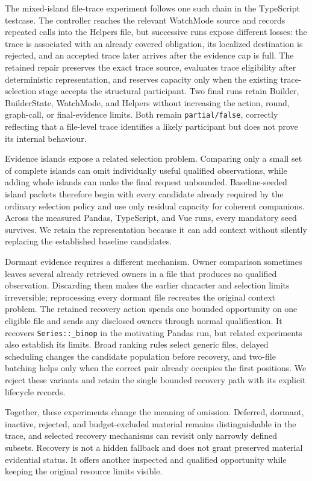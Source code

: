 The mixed-island file-trace experiment follows one such chain in the TypeScript testcase. The controller reaches the relevant WatchMode source and records repeated calls into the Helpers file, but successive runs expose different losses: the trace is associated with an already covered obligation, its localized destination is rejected, and an accepted trace later arrives after the evidence cap is full. The retained repair preserves the exact trace source, evaluates trace eligibility after deterministic representation, and reserves capacity only when the existing trace-selection stage accepts the structural participant. Two final runs retain Builder, BuilderState, WatchMode, and Helpers without increasing the action, round, graph-call, or final-evidence limits. Both remain \texttt{partial/false}, correctly reflecting that a file-level trace identifies a likely participant but does not prove its internal behaviour.

Evidence islands expose a related selection problem. Comparing only a small set of complete islands can omit individually useful qualified observations, while adding whole islands can make the final request unbounded. Baseline-seeded island packets therefore begin with every candidate already required by the ordinary selection policy and use only residual capacity for coherent companions. Across the measured Pandas, TypeScript, and Vue runs, every mandatory seed survives. We retain the representation because it can add context without silently replacing the established baseline candidates.

Dormant evidence requires a different mechanism. Owner comparison sometimes leaves several already retrieved owners in a file that produces no qualified observation. Discarding them makes the earlier character and selection limits irreversible; reprocessing every dormant file recreates the original context problem. The retained recovery action spends one bounded opportunity on one eligible file and sends any disclosed owners through normal qualification. It recovers \texttt{Series::\_binop} in the motivating Pandas run, but related experiments also establish its limits. Broad ranking rules select generic files, delayed scheduling changes the candidate population before recovery, and two-file batching helps only when the correct pair already occupies the first positions. We reject these variants and retain the single bounded recovery path with its explicit lifecycle records.

Together, these experiments change the meaning of omission. Deferred, dormant, inactive, rejected, and budget-excluded material remains distinguishable in the trace, and selected recovery mechanisms can revisit only narrowly defined subsets. Recovery is not a hidden fallback and does not grant preserved material evidential status. It offers another inspected and qualified opportunity while keeping the original resource limits visible.

